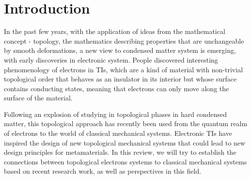 \documentclass[aps,pre,preprint,groupedaddress]{revtex4-1}
\begin{document}
\pacs{}

\maketitle

\section{Introduction}
In the past few years, with the application of ideas from the mathematical concept - topology, the mathematics describing properties that are unchangeable by smooth deformations, a new view to condensed matter system is emerging, with early discoveries in electronic system\cite{cite-key1}. People discovered interesting phenomenology of electrons in TIs, which are a kind of material with non-trivial topological order that behaves as an insulator in its interior but whose surface contains conducting states, meaning that electrons can only move along the surface of the material\cite{cite-key1,cite-key2,cite-key3}.

Following an explosion of studying in topological phases in hard condensed matter, this topological approach has recently been used from the quantum realm of electrons to the world of classical mechanical systems.  Electronic TIs have inspired the design of new topological mechanical systems that could lead to new design principles for metamaterials\cite{huber2016topological}. In this review, we will try to establish the connections between topological electrons systems to classical mechanical systems based on recent research work, as well as perspectives in this field.
\end{document}
